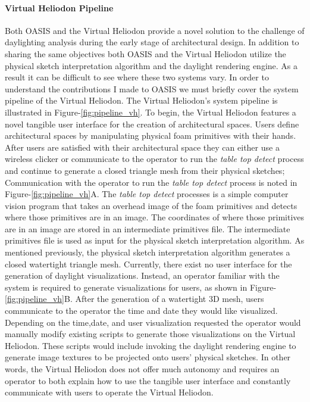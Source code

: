\paragraph{Virtual Heliodon Pipeline}
Both OASIS and the Virtual Heliodon provide a novel solution to the challenge of daylighting analysis during the early stage of architectural design.
In addition to sharing the same objectives both OASIS and the Virtual Heliodon utilize the physical sketch interpretation algorithm and the daylight rendering engine.
As a result it can be difficult to see where these two systems vary.
In order to understand the contributions I made to OASIS we must briefly cover the system pipeline of the Virtual Heliodon.
The Virtual Heliodon's system pipeline is illustrated in Figure-\ref{fig:pipeline_vh}.
To begin, the Virtual Heliodon features a novel tangible user interface for the creation of architectural spaces.
Users define architectural spaces by manipulating physical foam primitives with their hands.
After users are satisfied with their architectural space they can either use a wireless clicker or communicate to the operator to run the \textit{table top detect} process and continue to generate a closed triangle mesh from their physical sketches; Communication with the operator to run the \textit{table top detect} process is noted in Figure-\ref{fig:pipeline_vh}A.
The \textit{table top detect} processes is a simple computer vision program that takes an overhead image of the foam primitives and detects where those primitives are in an image.
The coordinates of where those primitives are in an image are stored in an intermediate primitives file. The intermediate primitives file is used as input for the physical sketch interpretation algorithm. As mentioned previously, the physical sketch interpretation algorithm generates a closed watertight triangle mesh.
Currently, there exist no user interface for the generation of daylight visualizations.
Instead, an operator familiar with the system is required to generate visualizations for users, as shown in Figure-\ref{fig:pipeline_vh}B.
After the generation of  a watertight 3D mesh, users communicate to the operator the time and date they would like visualized. 
Depending on the time,date, and user visualization requested the operator would manually modify existing scripts to generate those visualizations on the Virtual Heliodon.
These scripts would include invoking the daylight rendering engine to generate image textures to be projected onto users' physical sketches.
In other words, the Virtual Heliodon does not offer much autonomy and requires an operator to both explain how to use the tangible user interface and constantly communicate with users to operate the Virtual Heliodon.

